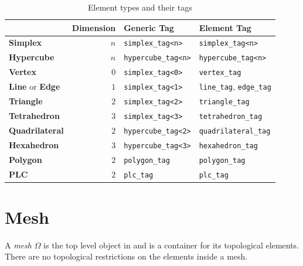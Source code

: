 \begin{table}[b]
 \centering
 \renewcommand{\arraystretch}{1.3}
\begin{tabular}{|l|r|l|l|}
\hline
          & Dimension & Generic Tag & Element Tag \\
\hline
 \textbf{Simplex}   & $n$ & \lstinline|simplex_tag<n>| & \lstinline|simplex_tag<n>| \\
 \textbf{Hypercube}   & $n$ & \lstinline|hypercube_tag<n>| & \lstinline|hypercube_tag<n>| \\
 \textbf{Vertex}   & $0$  & \lstinline|simplex_tag<0>|  & \lstinline|vertex_tag| \\
 \textbf{Line} or \textbf{Edge}   & $1$  & \lstinline|simplex_tag<1>|  & \lstinline|line_tag|, \lstinline|edge_tag| \\
 \textbf{Triangle}   & $2$  & \lstinline|simplex_tag<2>|  & \lstinline|triangle_tag| \\
 \textbf{Tetrahedron}   & $3$  & \lstinline|simplex_tag<3>|  & \lstinline|tetrahedron_tag| \\
 \textbf{Quadrilateral}   & $2$  & \lstinline|hypercube_tag<2>|  & \lstinline|quadrilateral_tag| \\
 \textbf{Hexahedron}   & $3$  & \lstinline|hypercube_tag<3>|  & \lstinline|hexahedron_tag| \\
 \textbf{Polygon}   & $2$  & \lstinline|polygon_tag|  & \lstinline|polygon_tag| \\
 \textbf{PLC}   & $2$  & \lstinline|plc_tag|  & \lstinline|plc_tag| \\
\hline
\end{tabular}
\caption{Element types and their tags}
\label{tab:element-type-and-tags}
\end{table}




\section{Mesh}
A \emph{mesh} $\Omega$ is the top level object in {\ViennaGrid} and is a container for its topological elements. There are no topological restrictions on the elements inside a mesh.

